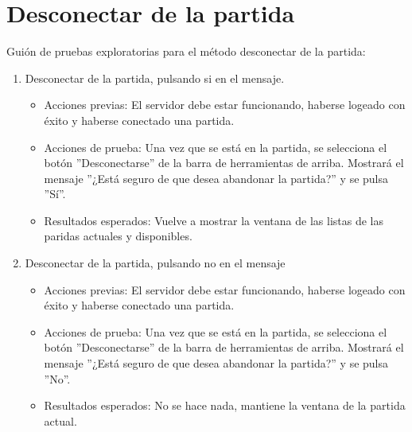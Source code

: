\section{Desconectar de la partida}

Guión de pruebas exploratorias para el método desconectar de la partida:

\begin{enumerate}
\item Desconectar de la partida, pulsando si en el mensaje.
	\begin{itemize}
	\item Acciones previas: El servidor debe estar funcionando, haberse logeado con éxito y haberse conectado una partida.
	\item Acciones de prueba: Una vez que se está en la partida, se selecciona el botón ''Desconectarse'' de la barra de herramientas de arriba. Mostrará el mensaje ''¿Está seguro de que desea abandonar la partida?'' y se pulsa ''Sí''.
	\item Resultados esperados: Vuelve a mostrar la ventana de las listas de las paridas actuales y disponibles.
	\end{itemize}
\item Desconectar de la partida, pulsando no en el mensaje
	\begin{itemize}
	\item Acciones previas: El servidor debe estar funcionando, haberse logeado con éxito y haberse conectado una partida.
	\item Acciones de prueba: Una vez que se está en la partida, se selecciona el botón ''Desconectarse'' de la barra de herramientas de arriba. Mostrará el mensaje ''¿Está seguro de que desea abandonar la partida?'' y se pulsa ''No''.
	\item Resultados esperados: No se hace nada, mantiene la ventana de la partida actual.
	\end{itemize}
\end{enumerate}
